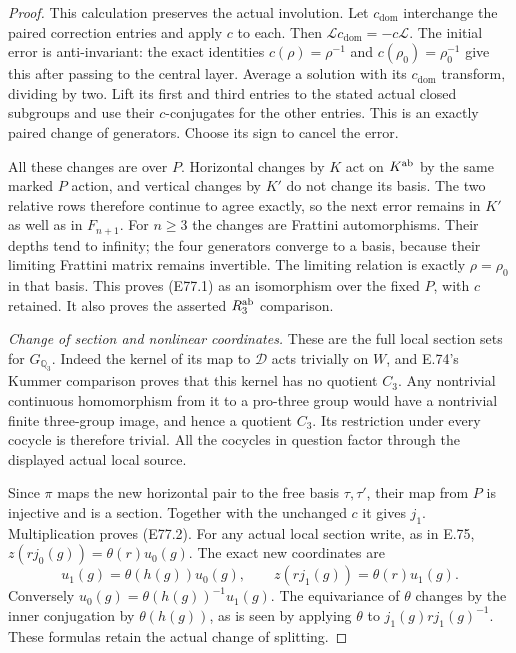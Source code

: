 \begin{proof}
This calculation preserves the actual
involution. Let $c_\mathrm{dom}$ interchange
the paired correction entries and apply
$c$ to each. Then
$\mathcal Lc_\mathrm{dom}=-c\mathcal L$.
The initial error is anti-invariant:
the exact identities
$c(\rho)=\rho^{-1}$ and
$c(\rho_0)=\rho_0^{-1}$ give this
after passing to the central layer.
Average a solution with its
$c_\mathrm{dom}$ transform, dividing
by two. Lift its first and third
entries to the stated actual closed
subgroups and use their $c$-conjugates
for the other entries. This is an
exactly paired change of generators.
Choose its sign to cancel the error.

All these changes are over $P$.
Horizontal changes by $K$ act on
$K^{\rm ab}$ by the same marked
$P$ action, and vertical changes
by $K'$ do not change its basis.
The two relative rows therefore
continue to agree exactly, so the
next error remains in $K'$ as
well as in $F_{n+1}$.
For $n\ge3$ the changes are
Frattini automorphisms.
Their depths tend to infinity;
the four generators converge to
a basis, because their limiting
Frattini matrix remains invertible.
The limiting relation is exactly
$\rho=\rho_0$ in that basis.
This proves (E77.1) as an isomorphism
over the fixed $P$, with $c$ retained.
It also proves the asserted
$R_3^{\rm ab}$ comparison.

\emph{Change of section and nonlinear coordinates.}
These are the full local section sets for
$G_{\mathbb Q_3}$. Indeed the kernel of its
map to $\mathcal D$ acts trivially on
$W$, and E.74's Kummer comparison proves
that this kernel has no quotient $C_3$.
Any nontrivial continuous homomorphism
from it to a pro-three group would have
a nontrivial finite three-group image,
and hence a quotient $C_3$. Its restriction
under every cocycle is therefore trivial.
All the cocycles in question factor
through the displayed actual local source.

Since $\pi$ maps the new horizontal
pair to the free basis $\tau,\tau'$,
their map from $P$ is injective
and is a section. Together with
the unchanged $c$ it gives $j_1$.
Multiplication proves (E77.2).
For any actual local section write,
as in E.75,
$z(rj_0(g))=\theta(r)u_0(g)$.
The exact new coordinates are
\[
 u_1(g)=\theta(h(g))u_0(g),\qquad
 z(rj_1(g))=\theta(r)u_1(g).
 \tag{E77.19}
\]
Conversely $u_0(g)=
\theta(h(g))^{-1}u_1(g)$.
The equivariance of $\theta$
changes by the inner conjugation
by $\theta(h(g))$, as is seen
by applying $\theta$ to
$j_1(g)rj_1(g)^{-1}$.
These formulas retain the
actual change of splitting.


\end{proof}

